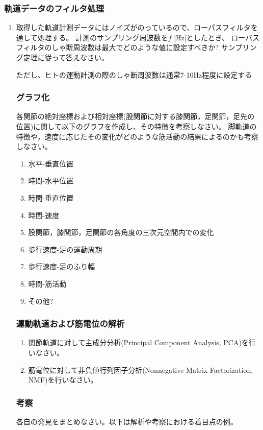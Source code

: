 \documentclass{jarticle}
\begin{document}
\subsubsection{軌道データのフィルタ処理}
\begin{enumerate}
\item 取得した軌道計測データにはノイズがのっているので、ローパスフィルタを
  通して処理する。
  計測のサンプリング周波数を$f$ [Hz]としたとき、
  ローバスフィルタのしゃ断周波数は最大でどのような値に設定すべきか? 
  サンプリング定理に従って答えなさい。

  ただし、ヒトの運動計測の際のしゃ断周波数は通常7-10Hz程度に設定する

\subsubsection{グラフ化}

各関節の絶対座標および相対座標(股関節に対する膝関節，足関節，足先の位置)に関して以下のグラフを作成し、その特徴を考察しなさい。
脚軌道の特徴や，速度に応じたその変化がどのような筋活動の結果によるのかも考察しなさい。
\begin{enumerate}
\item 水平-垂直位置
\item 時間-水平位置
\item 時間-垂直位置
\item 時間-速度
\item 股関節，膝関節，足関節の各角度の三次元空間内での変化
\item 歩行速度-足の運動周期
\item 歩行速度-足のふり幅
\item 時間-筋活動
\item その他?
\end{enumerate}

\subsubsection{運動軌道および筋電位の解析}

\begin{enumerate}
  \item 関節軌道に対して主成分分析(Principal Component Analysis, PCA)を行いなさい。
  \item 筋電位に対して非負値行列因子分析(Nonnegative Matrix Factorization, NMF)を行いなさい。
\end{enumerate}

\subsubsection{考察}
各自の発見をまとめなさい。以下は解析や考察における着目点の例。


\end{enumerate}
\end{document}

